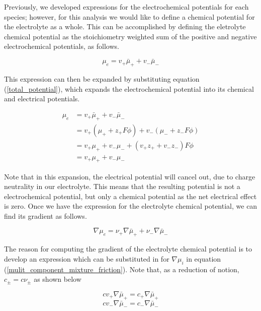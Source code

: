 \documentclass[lettersize,journal]{IEEEtran}
\begin{document}
Previously, we developed expressions for the electrochemical potentials for each species; however, for this analysis we would like to define a chemical potential for the electrolyte as a whole. This can be accomplished by defining the eletrolyte chemical potential as the stoichiometry weighted sum of the positive and negative electrochemical potentials, as follows.

\begin{equation}\label{electro_chem_potential}
\mu_{e}=v_{+} \bar{\mu}_{+}+v_{-} \bar{\mu}_{-}
\end{equation}

This expression can then be expanded by substituting equation (\ref{total_potential}), which expands the electrochemical potential into its chemical and electrical potentials.


\begin{equation}
\begin{aligned}
\mu_{e} &=v_{+} \bar{\mu}_{+}+v_{-} \bar{\mu}_{-} \\
&=v_{+}\left(\mu_{+}+z_{+} F \phi\right)+v_{-}\left(\mu_{-}+z_{-} F \phi\right) \\
&=v_{+} \mu_{+}+v_{-} \mu_{-}+\left(v_{+} z_{+}+v_{-} z_{-}\right) F \phi \\
&=v_{+} \mu_{+}+v_{-} \mu_{-}
\end{aligned}
\end{equation}

Note that in this expansion, the electrical potential will cancel out, due to charge neutrality in our electrolyte. This means that the resulting potential is not a electrochemical potential, but only a chemical potential as the net electrical effect is zero. Once we have the expression for the electrolyte chemical potential, we can find its gradient as follows.

\begin{equation}\label{eletrolyte_chem_pot_grad}
\nabla \mu_{e}=\nu_{+} \nabla \bar{\mu}_{+}+\nu_{-} \nabla \bar{\mu}_{-}
\end{equation}


The reason for computing the gradient of the electrolyte chemical potential is to develop an expression which can be substituted in for $\nabla \mu_i$ in equation (\ref{mulit_component_mixture_friction}). Note that, as a reduction of notion, $c_{\pm} = c \nu_{\pm}$ as shown below


\begin{equation}\label{stoich_concentration_pos}
c v_{+} \nabla \bar{\mu}_{+}=c_{+} \nabla \bar{\mu}_{+}
\end{equation}
\begin{equation}\label{stoich_concentration_neg}
   c v_{-} \nabla \bar{\mu}_{-}=c_{-} \nabla \bar{\mu}_{-}
\end{equation}
\end{document}
